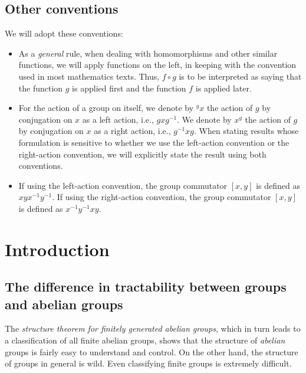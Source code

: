 \subsection{Other conventions}

We will adopt these conventions:

\begin{itemize}
\item As a {\em general} rule, when dealing with homomorphisms and
  other similar functions, we will apply functions on the left, in
  keeping with the convention used in most mathematics texts. Thus, $f
  \circ g$ is to be interpreted as saying that the function $g$ is
  applied first and the function $f$ is applied later.
\item For the action of a group on itself, we denote by ${}^gx$ the
  action of $g$ by conjugation on $x$ as a left action, i.e.,
  $gxg^{-1}$. We denote by $x^g$ the action of $g$ by conjugation on
  $x$ as a right action, i.e., $g^{-1}xg$. When stating results whose
  formulation is sensitive to whether we use the left-action
  convention or the right-action convention, we will explicitly state
  the result using both conventions.
\item If using the left-action convention, the group commutator
  $[x,y]$ is defined as $xyx^{-1}y^{-1}$. If using the right-action
  convention, the group commutator $[x,y]$ is defined as
  $x^{-1}y^{-1}xy$.
\end{itemize}



\section{Introduction}\label{sec:intro}

\subsection{The difference in tractability between groups and abelian groups}

The {\em structure theorem for finitely generated abelian groups},
which in turn leads to a classification of all finite abelian groups,
shows that the structure of {\em abelian} groups is fairly easy to
understand and control. On the other hand, the structure of groups in
general is wild.  Even classifying finite groups is extremely
difficult.

